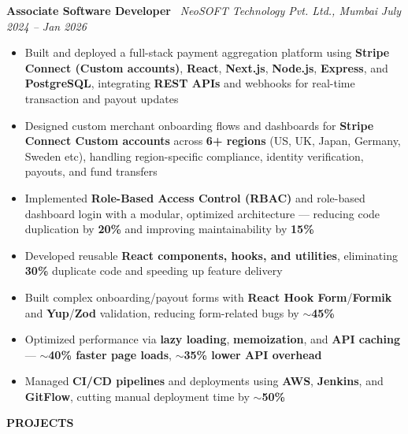 \documentclass[a4paper,10pt]{article}
\newcommand{\resumeskipsection}{\vspace{7pt}}
\newcommand{\resumeskipentry}{\vspace{5pt}}
\newcommand{\resumeskipafterheader}{\vspace{3pt}}
\newcommand{\resumejobtitle}{\fontsize{10pt}{12pt}\selectfont\bfseries\color{primary}}
\newcommand{\resumejobmeta}{\fontsize{10pt}{12pt}\selectfont\itshape\color{bodytext}}
\newcommand{\resumedate}{\fontsize{10pt}{12pt}\selectfont\itshape\color{bodytext}}
\newcommand{\kw}[1]{\textbf{\color{primary}#1}}
\newcommand{\metric}[1]{\textbf{\color{accent}#1}}
\newcommand{\sectionheader}[1]{%
    \resumeskipsection
    \noindent
    \colorbox{primary}{%
        \parbox{\dimexpr\linewidth-2\fboxsep}{%
            \vspace{2pt}%
            {\resumesection #1}%
            \vspace{2pt}%
        }%
    }%
    \resumeskipafterheader
}
\newcommand{\resumesection}{\fontsize{11pt}{13pt}\selectfont\bfseries\color{white}}
\newcommand{\jobentry}[4]{%
    \noindent
    {\resumejobtitle #1} \textbar\ {\resumejobmeta #2} \hfill {\resumedate #3}%
    \begin{itemize}
        #4
    \end{itemize}%
    \resumeskipentry
}
\begin{document}
\jobentry{Associate Software Developer}{NeoSOFT Technology Pvt. Ltd., Mumbai}{July 2024 -- Jan 2026}{%
    \item Built and deployed a full-stack payment aggregation platform using \kw{Stripe Connect (Custom accounts)}, \kw{React}, \kw{Next.js}, \kw{Node.js}, \kw{Express}, and \kw{PostgreSQL}, integrating \kw{REST APIs} and webhooks for real-time transaction and payout updates
    \item Designed custom merchant onboarding flows and dashboards for \kw{Stripe Connect Custom accounts} across \metric{6+ regions} (US, UK, Japan, Germany, Sweden etc), handling region-specific compliance, identity verification, payouts, and fund transfers
    \item Implemented \kw{Role-Based Access Control (RBAC)} and role-based dashboard login with a modular, optimized architecture --- reducing code duplication by \metric{20\%} and improving maintainability by \metric{15\%}
    \item Developed reusable \kw{React components, hooks, and utilities}, eliminating \metric{30\%} duplicate code and speeding up feature delivery
    \item Built complex onboarding/payout forms with \kw{React Hook Form}/\kw{Formik} and \kw{Yup}/\kw{Zod} validation, reducing form-related bugs by \metric{$\sim$45\%}
    \item Optimized performance via \kw{lazy loading}, \kw{memoization}, and \kw{API caching} --- \metric{$\sim$40\% faster page loads}, \metric{$\sim$35\% lower API overhead}
    \item Managed \kw{CI/CD pipelines} and deployments using \kw{AWS}, \kw{Jenkins}, and \kw{GitFlow}, cutting manual deployment time by \metric{$\sim$50\%}
}

\newpage
\sectionheader{PROJECTS}
\end{document}
